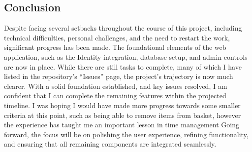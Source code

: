 \documentclass{article}
\begin{document}
\subsection{Conclusion}
Despite facing several setbacks throughout the course of this project, including technical difficulties, personal challenges, and the need to restart the work, significant progress has been made. The foundational elements of the web application, such as the Identity integration, database setup, and admin controls are now in place. While there are still tasks to complete, many of which I have listed in the repository's ``Issues'' page, the project's trajectory is now much clearer. With a solid foundation established, and key issues resolved, I am confident that I can complete the remaining features within the projected timeline. I was hoping I would have made more progress towards some smaller criteria at this point, such as being able to remove items from basket, however the experience has taught me an important lesson in time management Going forward, the focus will be on polishing the user experience, refining functionality, and ensuring that all remaining components are integrated seamlessly.

\nocite{*}
\printbibliography[heading=bibnumbered]
\end{document}
